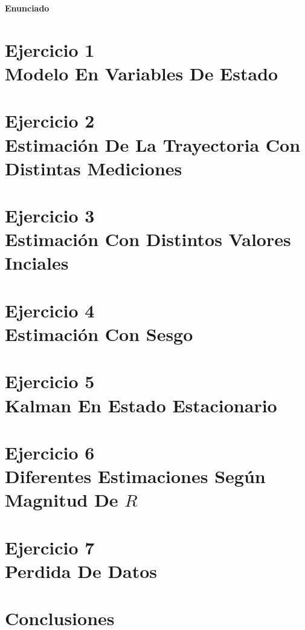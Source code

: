 \documentclass[10pt,a4paper]{article}
\begin{document}
		
	\setcounter{page}{1}

\begin{center}{\Large{\textbf{Enunciado}}}\end{center}
		

	\section{Ejercicio 1 \\ Modelo En Variables De Estado}\label{sec:ej1}
		
		
	\section{Ejercicio 2 \\ Estimación De La Trayectoria Con Distintas Mediciones}\label{sec:ej2}
		

	\section{Ejercicio 3 \\ Estimación Con Distintos Valores Inciales}\label{sec:ej3}
		

	\section{Ejercicio 4 \\ Estimación Con Sesgo}\label{sec:ej4}
		

	\section{Ejercicio 5 \\ Kalman En Estado Estacionario}\label{sec:ej6}
		

	\section{Ejercicio 6 \\ Diferentes Estimaciones Según Magnitud De $R$}\label{sec:ej5}
		

	\section{Ejercicio 7 \\ Perdida De Datos}\label{sec:ej7}
		

	\section{Conclusiones}\label{sec:conclusiones}
		

\end{document}
